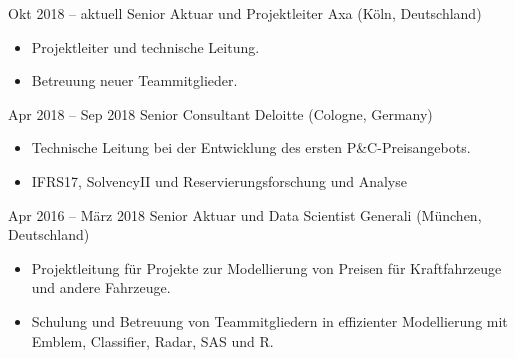 \documentclass[a4paper,]{fortysecondscv}
\begin{document}
\begin{cvtable}%

    \vspace{\topsep}
    \cvitem
    {Okt 2018 -- aktuell}
    {Senior Aktuar und Projektleiter}
    {Axa (Köln, Deutschland)}
    {
        \vspace{-\topsep}
        \begin{itemize}[nosep, leftmargin=0pt] %
            \item Projektleiter und technische Leitung.
            \item Betreuung neuer Teammitglieder.
        \end{itemize}
    }
    \vspace{\topsep}
    \cvitem
    {Apr 2018 -- Sep 2018}
    {Senior Consultant}
    {Deloitte (Cologne, Germany)}
    {
        \vspace{-\topsep}
        \begin{itemize}[nosep, leftmargin=0pt] %
            \item Technische Leitung bei der Entwicklung des ersten P\&C-Preisangebots.
            \item IFRS17, SolvencyII und Reservierungsforschung und Analyse
        \end{itemize}
    }
    \vspace{\topsep}
    \cvitem
    {Apr 2016 -- März 2018}
    {Senior Aktuar und Data Scientist}
    {Generali (München, Deutschland)}
    {
        \vspace{-\topsep}
        \begin{itemize}[nosep, leftmargin=0pt] %
            \item Projektleitung für Projekte zur Modellierung von Preisen für Kraftfahrzeuge und andere Fahrzeuge.
            \item Schulung und Betreuung von Teammitgliedern in effizienter Modellierung mit Emblem, Classifier, Radar, SAS und R.
        \end{itemize}
    }

\end{cvtable}
\end{document}
